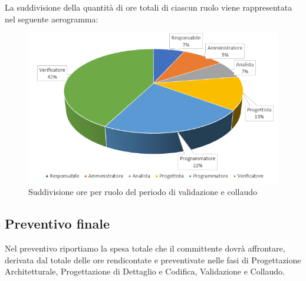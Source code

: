 La suddivisione della quantità di ore totali di ciascun ruolo viene rappresentata nel seguente aerogramma:

\begin{figure}[h]
	\centering
	\includegraphics[scale=2.5]{sezioni/Aerogrammi/AerogrammaValidazione.png}
	\caption{Suddivisione ore per ruolo del periodo di validazione e collaudo}
\end{figure}


\clearpage
\subsection{Preventivo finale} 
Nel preventivo riportiamo la spesa totale che il committente dovrà affrontare, derivata dal totale delle ore rendicontate e preventivate nelle fasi di Progettazione Architetturale, Progettazione di Dettaglio e Codifica, Validazione e Collaudo.\\

